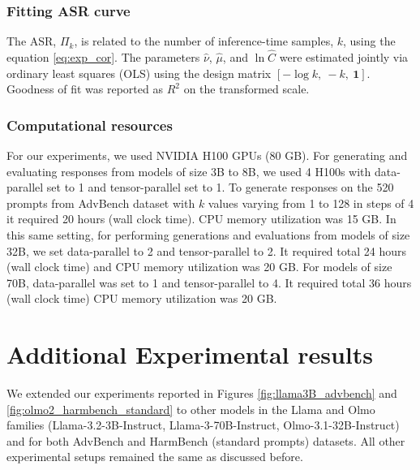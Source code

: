 \documentclass{article}
\theoremstyle{remark} %
\begin{document}
\subsubsection{Fitting ASR curve}
The ASR, $\Pi_k$, is related to the number of inference-time samples, $k$, using the equation \ref{eq:exp_cor}. The parameters $\hat{\nu}$, $\hat{\mu}$, and $\ln \hat{C}$ were estimated jointly via ordinary least squares (OLS) using the design matrix $[-\log k,\ -k,\ \mathbf{1}]$. Goodness of fit was reported as $R^2$ on the transformed scale.

\subsubsection{Computational resources}
For our experiments, we used NVIDIA H100 GPUs (80 GB). For generating and evaluating responses from models of size 3B to 8B, we used 4 H100s with data-parallel set to 1 and tensor-parallel set to 1. To generate responses on the 520 prompts from AdvBench dataset with $k$ values varying from 1 to 128 in steps of 4 it required 20 hours (wall clock time). CPU memory utilization was 15 GB. In this same setting, for performing generations and evaluations from models of size 32B, we set data-parallel to 2 and tensor-parallel to 2. It required total 24 hours  (wall clock time) and CPU memory utilization was 20 GB. For models of size 70B, data-parallel was set to 1 and tensor-parallel to 4. It required total 36 hours (wall clock time) CPU memory utilization was 20 GB. 

\section{Additional Experimental results}\label{add_expt}

We extended our experiments reported in Figures \ref{fig:llama3B_advbench} and \ref{fig:olmo2_harmbench_standard} to other models in the Llama and Olmo families (Llama-3.2-3B-Instruct, Llama-3-70B-Instruct, Olmo-3.1-32B-Instruct) and for both AdvBench and HarmBench (standard prompts) datasets. All other experimental setups remained the same as discussed before.
\end{document}
